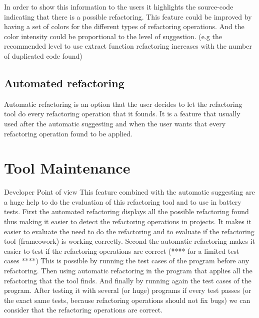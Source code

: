 In order to show this information to the users it highlights the source-code indicating
that there is a possible refactoring.
This feature could be improved by having a set of colors for the different types
of refactoring operations. And the color intensity could be proportional to the level
of suggestion. (e.g the recommended level to use extract function refactoring
increases with the number of duplicated code found)


\subsection{Automated refactoring}
Automatic refactoring is an option that the user decides to let the refactoring
tool do every refactoring operation that it founds. It is a feature that usually used
after the automatic suggesting and when the user wants that every refactoring operation
found to be applied.



\section{Tool Maintenance}
Developer Point of view
This feature combined with the automatic suggesting are a huge help to do the
evaluation of this refactoring tool and to use in battery tests.
First the automated refactoring displays all the possible refactoring found thus making it easier
to detect the refactoring operations in projects.
It makes it easier to evaluate the need to do the refactoring and to evaluate
if the refactoring tool (frameowork) is working correctly.
Second the automatic refactoring makes it easier to test if the refactoring operations are correct (**** for a limited test cases ****)
This is possible by running the test cases of the program before any refactoring.
Then using automatic refactoring in the program that applies all the refactoring that the tool finds.
And finally by running again the test cases of the program.
After testing it with several (or huge) programs if every test passes (or the exact same tests, because refactoring operations should not fix bugs)
we can consider that the refactoring operations are correct.


